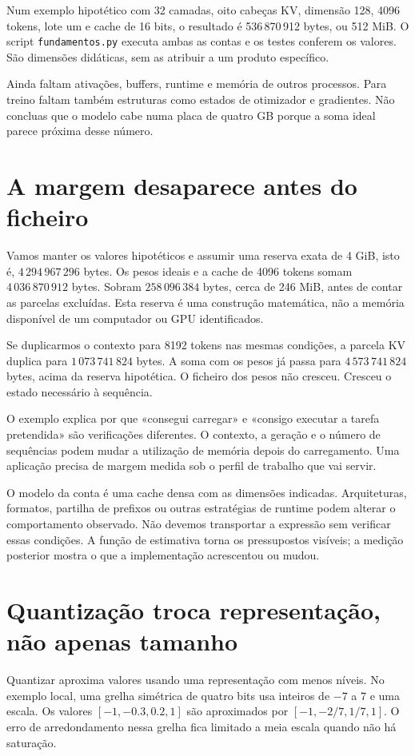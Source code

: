 Num exemplo hipotético com 32 camadas, oito cabeças KV, dimensão 128, 4096 tokens, lote um e cache de 16 bits, o resultado é 536\,870\,912 bytes, ou 512 MiB. O script \texttt{fundamentos.py} executa ambas as contas e os testes conferem os valores. São dimensões didáticas, sem as atribuir a um produto específico.

Ainda faltam ativações, buffers, runtime e memória de outros processos. Para treino faltam também estruturas como estados de otimizador e gradientes. Não concluas que o modelo cabe numa placa de quatro GB porque a soma ideal parece próxima desse número.

\section{A margem desaparece antes do ficheiro}
Vamos manter os valores hipotéticos e assumir uma reserva exata de 4 GiB, isto é, $4\,294\,967\,296$ bytes. Os pesos ideais e a cache de 4096 tokens somam $4\,036\,870\,912$ bytes. Sobram $258\,096\,384$ bytes, cerca de 246 MiB, antes de contar as parcelas excluídas. Esta reserva é uma construção matemática, não a memória disponível de um computador ou GPU identificados.

Se duplicarmos o contexto para 8192 tokens nas mesmas condições, a parcela KV duplica para $1\,073\,741\,824$ bytes. A soma com os pesos já passa para $4\,573\,741\,824$ bytes, acima da reserva hipotética. O ficheiro dos pesos não cresceu. Cresceu o estado necessário à sequência.

O exemplo explica por que «consegui carregar» e «consigo executar a tarefa pretendida» são verificações diferentes. O contexto, a geração e o número de sequências podem mudar a utilização de memória depois do carregamento. Uma aplicação precisa de margem medida sob o perfil de trabalho que vai servir.

O modelo da conta é uma cache densa com as dimensões indicadas. Arquiteturas, formatos, partilha de prefixos ou outras estratégias de runtime podem alterar o comportamento observado. Não devemos transportar a expressão sem verificar essas condições. A função de estimativa torna os pressupostos visíveis; a medição posterior mostra o que a implementação acrescentou ou mudou.

\section{Quantização troca representação, não apenas tamanho}
Quantizar aproxima valores usando uma representação com menos níveis. No exemplo local, uma grelha simétrica de quatro bits usa inteiros de $-7$ a $7$ e uma escala. Os valores $[-1,-0.3,0.2,1]$ são aproximados por $[-1,-2/7,1/7,1]$. O erro de arredondamento nessa grelha fica limitado a meia escala quando não há saturação.

